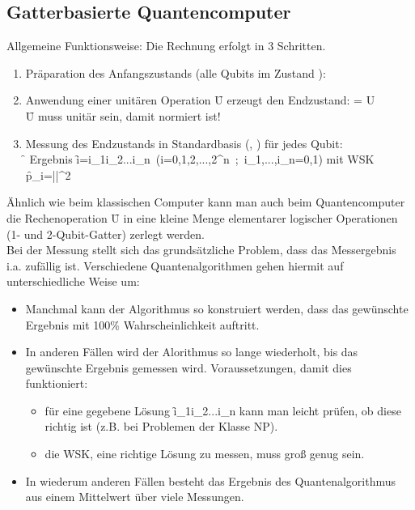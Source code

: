 \subsection{Gatterbasierte Quantencomputer}
Allgemeine Funktionsweise: Die Rechnung erfolgt in 3 Schritten.
\begin{enumerate}
    \item Präparation des Anfangszustands (alle Qubits im Zustand ):
    \item Anwendung einer unitären Operation \f{U} erzeugt den Endzustand: \f{\cket{\psi} = U}\\
    \f{U} muss unitär sein, damit \ket{\psi} normiert ist!
    \item Messung des Endzustands in Standardbasis (, ) für jedes Qubit:\\
    \f{\rightarrow} Ergebnis \f{i=i_1i_2...i_n\ (i=0,1,2,...,2^n\ ;\ i_1,...,i_n=0,1)} mit WSK \f{p_i=||^2} 
\end{enumerate}

Ähnlich wie beim klassischen Computer kann man auch beim Quantencomputer die Rechenoperation \f{U} in eine kleine Menge elementarer logischer Operationen (1- und 2-Qubit-Gatter) zerlegt werden.\\
Bei der Messung stellt sich das grundsätzliche Problem, dass das Messergebnis i.a. zufällig ist. Verschiedene Quantenalgorithmen gehen hiermit auf unterschiedliche Weise um:
\begin{itemize}
    \item Manchmal kann der Algorithmus so konstruiert werden, dass das gewünschte Ergebnis mit 100\% Wahrscheinlichkeit auftritt.
    \item In anderen Fällen wird der Alorithmus so lange wiederholt, bis das gewünschte Ergebnis gemessen wird. Voraussetzungen, damit dies funktioniert:
    \begin{itemize}
        \item für eine gegebene Lösung \f{i_1i_2...i_n} kann man leicht prüfen, ob diese richtig ist (z.B. bei Problemen der Klasse NP).
        \item die WSK, eine richtige Lösung zu messen, muss groß genug sein.
    \end{itemize}
    \item In wiederum anderen Fällen besteht das Ergebnis des Quantenalgorithmus aus einem Mittelwert über viele Messungen.
\end{itemize}



